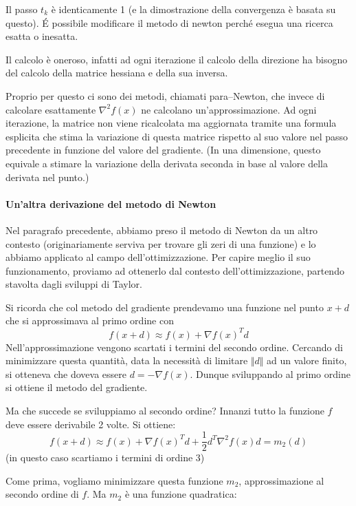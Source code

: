 \begin{observation} Il passo $t_k$ \`e identicamente 1 (e la
dimostrazione della convergenza \`e basata su questo). É possibile
modificare il metodo di newton perch\'e esegua una ricerca esatta o
inesatta.
\end{observation}

\begin{observation} Il calcolo \`e oneroso, infatti ad ogni iterazione
il calcolo della direzione ha bisogno del calcolo della matrice
hessiana e della sua inversa.

Proprio per questo ci sono dei metodi, chiamati para--Newton, che
invece di calcolare esattamente $\nabla^2f(x)$ ne calcolano
un'approssimazione. Ad ogni iterazione, la matrice non viene
ricalcolata ma aggiornata tramite una formula esplicita che stima la
variazione di questa matrice rispetto al suo valore nel passo
precedente in funzione del valore del gradiente. (In una dimensione,
questo equivale a stimare la variazione della derivata seconda in base
al valore della derivata nel punto.)
\end{observation}

\paragraph{Un'altra derivazione del metodo di Newton} Nel paragrafo
precedente, abbiamo preso il metodo di Newton da un altro contesto
(originariamente serviva per trovare gli zeri di una funzione) e lo
abbiamo applicato al campo dell'ottimizzazione. Per capire meglio il
suo funzionamento, proviamo ad ottenerlo dal contesto
dell'ottimizzazione, partendo stavolta dagli sviluppi di Taylor.

Si ricorda che col metodo del gradiente prendevamo una funzione nel
punto $x+d$ che si approssimava al primo ordine con
$$f(x + d) \approx f(x) + \nabla f(x)^{T} d$$
Nell'approssimazione vengono scartati i termini del secondo
ordine. Cercando di minimizzare questa quantit\`a, data la necessit\`a di
limitare $\Vert d \Vert$ ad un valore finito, si otteneva che doveva
essere $d=-\nabla f(x)$. Dunque sviluppando al primo ordine si ottiene
il metodo del gradiente.

Ma che succede se sviluppiamo al secondo ordine? Innanzi tutto la
funzione $f$ deve essere derivabile 2 volte. Si ottiene:
$$f(x + d) \approx f(x) + \nabla f(x)^{T} d + \frac{1}{2} d^{T} \nabla^2 f(x)d = m_2(d)$$
(in questo caso scartiamo i termini di ordine 3)

Come prima, vogliamo minimizzare questa funzione $m_2$,
approssimazione al secondo ordine di $f$. Ma $m_2$ \`e una funzione
quadratica:

